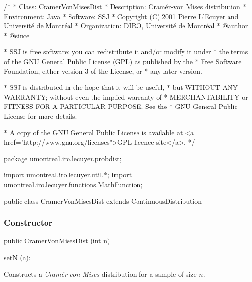 \begin{code}
\begin{hide}
/*
 * Class:        CramerVonMisesDist
 * Description:  Cramér-von Mises distribution
 * Environment:  Java
 * Software:     SSJ 
 * Copyright (C) 2001  Pierre L'Ecuyer and Université de Montréal
 * Organization: DIRO, Université de Montréal
 * @author       
 * @since

 * SSJ is free software: you can redistribute it and/or modify it under
 * the terms of the GNU General Public License (GPL) as published by the
 * Free Software Foundation, either version 3 of the License, or
 * any later version.

 * SSJ is distributed in the hope that it will be useful,
 * but WITHOUT ANY WARRANTY; without even the implied warranty of
 * MERCHANTABILITY or FITNESS FOR A PARTICULAR PURPOSE.  See the
 * GNU General Public License for more details.

 * A copy of the GNU General Public License is available at
   <a href="http://www.gnu.org/licenses">GPL licence site</a>.
 */
\end{hide}
package umontreal.iro.lecuyer.probdist;
\begin{hide}
import umontreal.iro.lecuyer.util.*;
import umontreal.iro.lecuyer.functions.MathFunction;
\end{hide} 

public class CramerVonMisesDist extends ContinuousDistribution\begin{hide} {
   protected int n;

   private static class Function implements MathFunction {
      protected int n;
      protected double u;

      public Function (int n, double u) {
         this.n = n;
         this.u = u;
      }

      public double evaluate (double x) {
         return u - cdf(n,x);
      }
   }
\end{hide}
\end{code}
\subsubsection* {Constructor}

\begin{code}

   public CramerVonMisesDist (int n)\begin{hide} {
      setN (n);
   }\end{hide}
\end{code}
\begin{tabb}
 Constructs a {\em Cram\'er-von Mises\/} distribution for a sample of size $n$.
\end{tabb}

